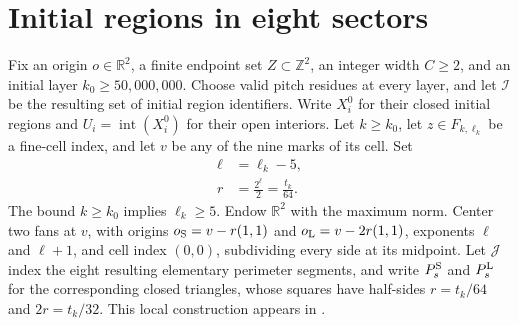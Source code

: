 \section{Initial regions in eight sectors}
\label{sec:area_law_actual_sector_assignment}

Fix an origin $o\in\mathbb R^2$, a finite endpoint set
$Z\subset\mathbb Z^2$, an integer width $C\ge2$, and an initial layer
$k_0\ge50{,}000{,}000$. Choose valid pitch residues at every
layer, and let $\mathcal I$ be the resulting set of initial region identifiers.
Write $X_i^0$ for their closed initial regions and
$U_i=\operatorname{int}(X_i^0)$ for their open interiors.
Let $k\ge k_0$, let $z\in F_{k,\ell_k}$ be a fine-cell index,
and let $v$ be any of the nine marks of its cell. Set
\begin{align}
    \ell & =\ell_k-5,                        \\
    r    & =\frac{2^\ell}{2}=\frac{t_k}{64}.
\end{align}
The bound $k\ge k_0$ implies $\ell_k\ge5$. Endow $\mathbb R^2$ with the
maximum norm. Center two fans at $v$, with origins
$o_{\rm S}=v-r(1,1)$ and $o_{\rm L}=v-2r(1,1)$, exponents $\ell$ and
$\ell+1$, and cell index $(0,0)$, subdividing every side at its midpoint.
Let $\mathcal J$ index the eight resulting elementary perimeter segments, and
write $P_s^{\rm S}$ and $P_s^{\rm L}$ for the corresponding closed
triangles, whose squares have half-sides $r=t_k/64$ and $2r=t_k/32$.
This local construction appears in
\cite[Section~11]{OpenAI2026AreaLaw}.



